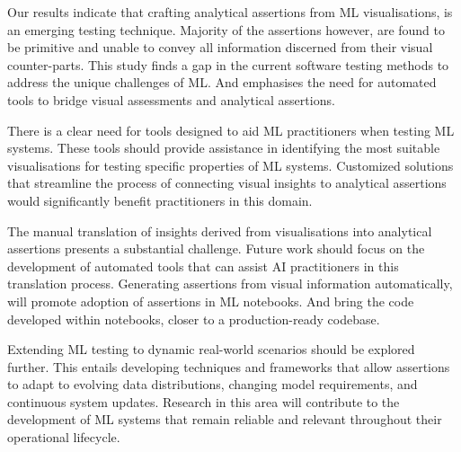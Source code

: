 Our results indicate that crafting analytical assertions from ML visualisations, is an emerging testing technique. Majority of the assertions however, are found to be primitive and unable to convey all information discerned from their visual counter-parts. This study finds a gap in the current software testing methods to address the unique challenges of ML. And emphasises the need for automated tools to bridge visual assessments and analytical assertions.

There is a clear need for tools designed to aid ML practitioners when testing ML systems. These tools should provide assistance in identifying the most suitable visualisations for testing specific properties of ML systems. Customized solutions that streamline the process of connecting visual insights to analytical assertions would significantly benefit practitioners in this domain.

The manual translation of insights derived from visualisations into analytical assertions presents a substantial challenge. Future work should focus on the development of automated tools that can assist AI practitioners in this translation process. Generating assertions from visual information automatically, will promote adoption of assertions in ML notebooks. And bring the code developed within notebooks, closer to a production-ready codebase.

Extending ML testing to dynamic real-world scenarios should be explored further. This entails developing techniques and frameworks that allow assertions to adapt to evolving data distributions, changing model requirements, and continuous system updates. Research in this area will contribute to the development of ML systems that remain reliable and relevant throughout their operational lifecycle.




